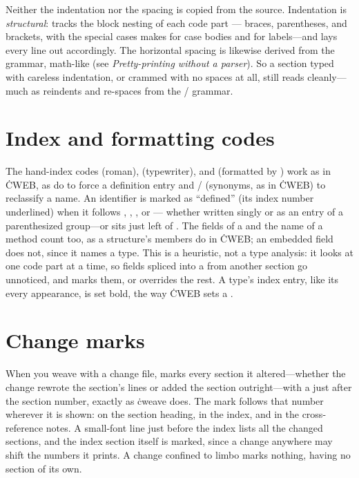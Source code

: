 Neither the indentation nor the spacing is copied from the source. Indentation is
{\it structural\/}:  tracks the block nesting of each code part ---
braces, parentheses, and brackets, with the special cases  makes for
 case bodies and for labels---and lays every line out accordingly. The
horizontal spacing is likewise derived from the grammar, math-like (see {\it
Pretty-printing without a parser\/}). So a section typed with careless indentation,
or crammed with no spaces at all, still reads cleanly---much as 
reindents and re-spaces from the \CEE/ grammar.

\section{Index and formatting codes}
The hand-index codes  (roman),  (typewriter),
and  (formatted by ) work as in \.{CWEB}, as do  to
force a definition entry and / (synonyms, as in \.{CWEB}) to
reclassify a name. An identifier is marked as ``defined'' (its index number
underlined) when it follows , , , or ---%
whether written singly or as an entry of a parenthesized group---or sits just
left of \cw{:=}. The fields of a  and the name of a method count too,
as a structure's members do in \.{CWEB}; an embedded field does not, since it
names a type. This is a heuristic, not a type analysis: it looks at one code
part at a time, so fields spliced into a  from another section go
unnoticed, and  marks them, or overrides the rest. A type's index entry, like its every appearance, is set bold, the way
\.{CWEB} sets a .

\section{Change marks} When you weave with a change file,  marks every
section it altered---whether the change rewrote the section's lines or added the
section outright---with a \cw{*} just after the section number, exactly as
\.{cweave} does. The mark follows that number wherever it is shown: on the section
heading, in the index, and in the cross-reference notes. A small-font line just
before the index lists all the changed sections, and the index section itself is
marked, since a change anywhere may shift the numbers it prints. A change confined
to limbo marks nothing, having no section of its own.

